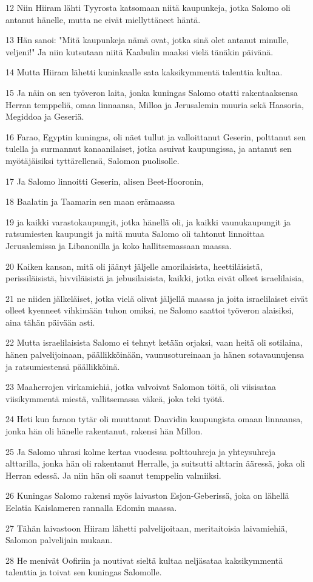 \par 12 Niin Hiiram lähti Tyyrosta katsomaan niitä kaupunkeja, jotka Salomo oli antanut hänelle, mutta ne eivät miellyttäneet häntä.
\par 13 Hän sanoi: "Mitä kaupunkeja nämä ovat, jotka sinä olet antanut minulle, veljeni!" Ja niin kutsutaan niitä Kaabulin maaksi vielä tänäkin päivänä.
\par 14 Mutta Hiiram lähetti kuninkaalle sata kaksikymmentä talenttia kultaa.
\par 15 Ja näin on sen työveron laita, jonka kuningas Salomo otatti rakentaaksensa Herran temppeliä, omaa linnaansa, Milloa ja Jerusalemin muuria sekä Haasoria, Megiddoa ja Geseriä.
\par 16 Farao, Egyptin kuningas, oli näet tullut ja valloittanut Geserin, polttanut sen tulella ja surmannut kanaanilaiset, jotka asuivat kaupungissa, ja antanut sen myötäjäisiksi tyttärellensä, Salomon puolisolle.
\par 17 Ja Salomo linnoitti Geserin, alisen Beet-Hooronin,
\par 18 Baalatin ja Taamarin sen maan erämaassa
\par 19 ja kaikki varastokaupungit, jotka hänellä oli, ja kaikki vaunukaupungit ja ratsumiesten kaupungit ja mitä muuta Salomo oli tahtonut linnoittaa Jerusalemissa ja Libanonilla ja koko hallitsemassaan maassa.
\par 20 Kaiken kansan, mitä oli jäänyt jäljelle amorilaisista, heettiläisistä, perissiläisistä, hivviläisistä ja jebusilaisista, kaikki, jotka eivät olleet israelilaisia,
\par 21 ne niiden jälkeläiset, jotka vielä olivat jäljellä maassa ja joita israelilaiset eivät olleet kyenneet vihkimään tuhon omiksi, ne Salomo saattoi työveron alaisiksi, aina tähän päivään asti.
\par 22 Mutta israelilaisista Salomo ei tehnyt ketään orjaksi, vaan heitä oli sotilaina, hänen palvelijoinaan, päällikköinään, vaunusotureinaan ja hänen sotavaunujensa ja ratsumiestensä päällikköinä.
\par 23 Maaherrojen virkamiehiä, jotka valvoivat Salomon töitä, oli viisisataa viisikymmentä miestä, vallitsemassa väkeä, joka teki työtä.
\par 24 Heti kun faraon tytär oli muuttanut Daavidin kaupungista omaan linnaansa, jonka hän oli hänelle rakentanut, rakensi hän Millon.
\par 25 Ja Salomo uhrasi kolme kertaa vuodessa polttouhreja ja yhteysuhreja alttarilla, jonka hän oli rakentanut Herralle, ja suitsutti alttarin ääressä, joka oli Herran edessä. Ja niin hän oli saanut temppelin valmiiksi.
\par 26 Kuningas Salomo rakensi myös laivaston Esjon-Geberissä, joka on lähellä Eelatia Kaislameren rannalla Edomin maassa.
\par 27 Tähän laivastoon Hiiram lähetti palvelijoitaan, meritaitoisia laivamiehiä, Salomon palvelijain mukaan.
\par 28 He menivät Oofiriin ja noutivat sieltä kultaa neljäsataa kaksikymmentä talenttia ja toivat sen kuningas Salomolle.

